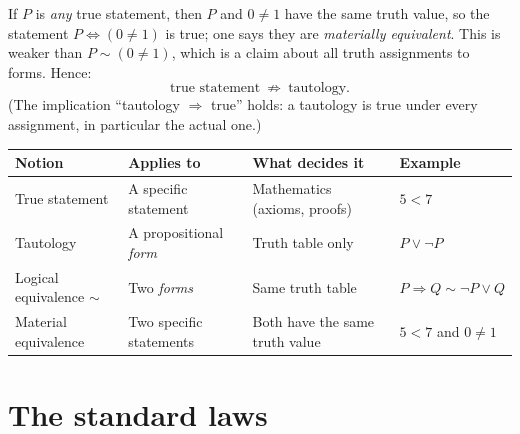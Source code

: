 If $P$ is \emph{any} true statement, then $P$ and $0\neq1$ have the same truth value, so the statement $P\Leftrightarrow(0\neq1)$ is true; one says they are \emph{materially equivalent}. This is weaker than $P\sim(0\neq 1)$, which is a claim about all truth assignments to forms. Hence:
\[
\text{true statement}\ \not\Rightarrow\ \text{tautology}.
\]
(The implication ``tautology $\Rightarrow$ true'' holds: a tautology is true under every assignment, in particular the actual one.)

\begin{center}
	\begin{tabular}{@{}p{3.2cm}p{4.2cm}p{3.7cm}p{3.4cm}@{}}
		\toprule
		\textbf{Notion} & \textbf{Applies to} & \textbf{What decides it} & \textbf{Example}\\
		\midrule
		True statement & A specific statement & Mathematics (axioms, proofs) & $5<7$\\
		Tautology & A propositional \emph{form} & Truth table only & $P\vee\neg P$\\
		Logical equivalence $\sim$ & Two \emph{forms} & Same truth table & $P\Rightarrow Q\sim\neg P\vee Q$\\
		Material equivalence & Two specific statements & Both have the same truth value & $5<7$ and $0\ne1$\\
		\bottomrule
	\end{tabular}
\end{center}

\section{The standard laws}

